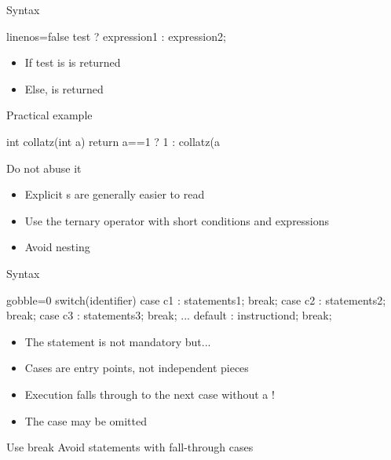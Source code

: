 \begin{frame}[fragile]
  \begin{block}{Syntax}
    \begin{cppcode*}{linenos=false}
      test ? expression1 : expression2;
    \end{cppcode*}
    \vspace{-0.2cm}
    \begin{itemize}
      \item If test is   is returned
      \item Else,  is returned
    \end{itemize}
  \end{block}
  \pause
  \begin{exampleblock}{Practical example}
    \begin{cppcode*}{}
      int collatz(int a) {
        return a==1 ? 1 : collatz(a%
      }
    \end{cppcode*}
  \end{exampleblock}
  \pause
  \begin{alertblock}{Do not abuse it}
    \begin{itemize}
      \item Explicit s are generally easier to read
      \item Use the ternary operator with short conditions and expressions
      \item Avoid nesting
    \end{itemize}
  \end{alertblock}
\end{frame}

\begin{frame}[fragile]
  \begin{block}{Syntax}
    \begin{cppcode*}{gobble=0}
      switch(identifier) {
        case c1 : statements1; break;
        case c2 : statements2; break;
        case c3 : statements3; break;
        ...
        default : instructiond; break;
      }
    \end{cppcode*}
    \begin{itemize}
      \item The  statement is not mandatory but...
      \item Cases are entry points, not independent pieces
      \item Execution falls through to the next case without a !
      \item The  case may be omitted
    \end{itemize}
  \end{block}
  \pause
  \begin{alertblock}{Use break}
    Avoid  statements with fall-through cases
  \end{alertblock}
\end{frame}

